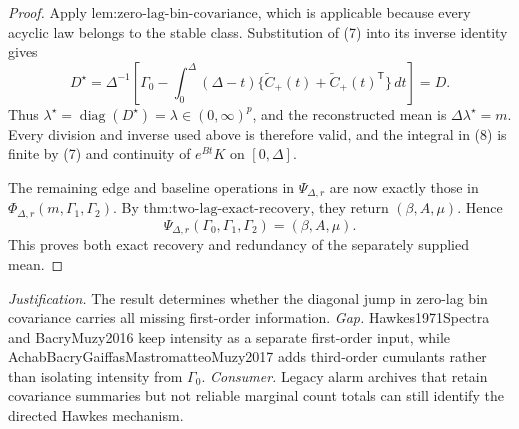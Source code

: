 \documentclass{article}
\begin{document}
\begin{proof}
Apply \(\text{lem:zero-lag-bin-covariance}\), which is applicable because every acyclic law belongs to the stable class.  Substitution of (7) into its inverse identity gives
\[
 D^\star=\Delta^{-1}\!\left[\Gamma_0-
 \int_0^\Delta(\Delta-t)
 \{\widetilde C_{+}(t)+\widetilde C_{+}(t)^{\mathsf T}\}\,dt\right]
 =D.
\tag{8}
\]
Thus \(\lambda^\star=\operatorname{diag}(D^\star)=\lambda\in(0,\infty)^p\), and the reconstructed mean is \(\Delta\lambda^\star=m\).  Every division and inverse used above is therefore valid, and the integral in (8) is finite by (7) and continuity of \(e^{Bt}K\) on \([0,\Delta]\).

The remaining edge and baseline operations in \(\Psi_{\Delta,r}\) are now exactly those in \(\Phi_{\Delta,r}(m,\Gamma_1,\Gamma_2)\).  By \(\text{thm:two-lag-exact-recovery}\), they return \((\beta,A,\mu)\).  Hence
\[
 \Psi_{\Delta,r}(\Gamma_0,\Gamma_1,\Gamma_2)=(\beta,A,\mu).
\]
This proves both exact recovery and redundancy of the separately supplied mean.
\end{proof}
\par\smallskip\noindent \textit{Justification.} The result determines whether the diagonal jump in zero-lag bin covariance carries all missing first-order information. \textit{Gap.} Hawkes1971Spectra and BacryMuzy2016 keep intensity as a separate first-order input, while AchabBacryGaiffasMastromatteoMuzy2017 adds third-order cumulants rather than isolating intensity from \(\Gamma_0\). \textit{Consumer.} Legacy alarm archives that retain covariance summaries but not reliable marginal count totals can still identify the directed Hawkes mechanism.
\end{document}
